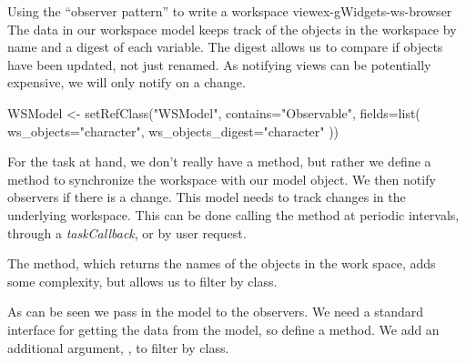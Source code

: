 \begin{example}{Using the ``observer pattern'' to write a workspace view}{ex-gWidgets-ws-browser}
The data in our workspace model keeps track of the objects in the
workspace by name and a digest of each variable. The digest allows us
to compare if objects have been updated, not just renamed. As
notifying views can be potentially expensive, we will only notify on a
change.

\begin{Schunk}
\begin{Sinput}
 WSModel <- setRefClass("WSModel",
                        contains="Observable",
                        fields=list(
                          ws_objects="character",
                          ws_objects_digest="character"
                          ))
\end{Sinput}
\end{Schunk}
%

For the task at hand, we don't really have a  method, but
rather we define a  method to synchronize the workspace
with our model object. We then notify observers if there is a
change. This model needs to track changes in the underlying
workspace. This can be done calling the  method at
periodic intervals, through a \textit{taskCallback}, or by user request.

\begin{Schunk}
\end{Schunk}
%
The  method, which returns the names of the
objects in the work space,  adds some complexity, but allows us to
filter by class.

As can be seen we pass in the model to the observers. We need a
standard interface for getting the data from the model, so define a
 method. We add an additional argument, , to
filter by class.


\end{example}
